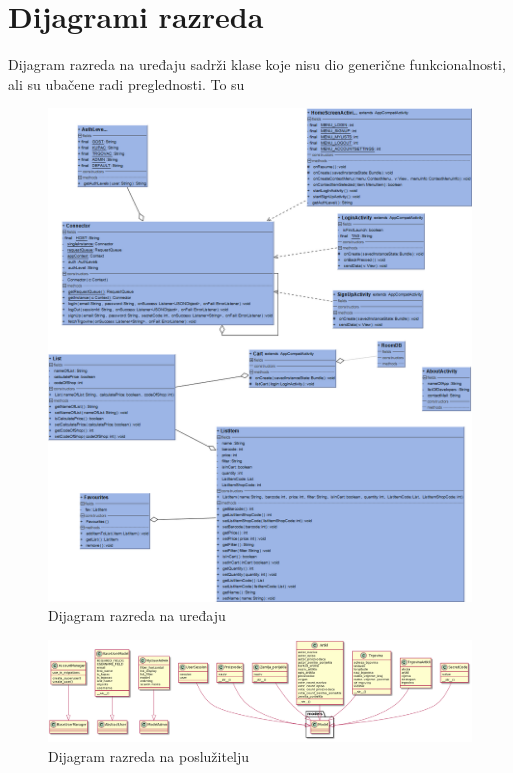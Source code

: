 			\eject
			
			
		\section{Dijagrami razreda}
		
		Dijagram razreda na uređaju sadrži klase koje nisu dio generične funkcionalnosti, ali su ubačene radi preglednosti. To su
		
		\begin{figure}[H]
		    \centering
			\includegraphics[scale=0.4]{dijagrami/class_uredaj.png}
			\caption{Dijagram razreda na uređaju}
			\label{fig:class_uredaj}
		\end{figure}
		
		\begin{figure}[H]
		    \centering
			\includegraphics[width=1.0\linewidth]{dijagrami/class_posluzitelj.png}
			\caption{Dijagram razreda na poslužitelju}
			\label{fig:class_posluzitelj}
		\end{figure}
			
			
			
			\eject

